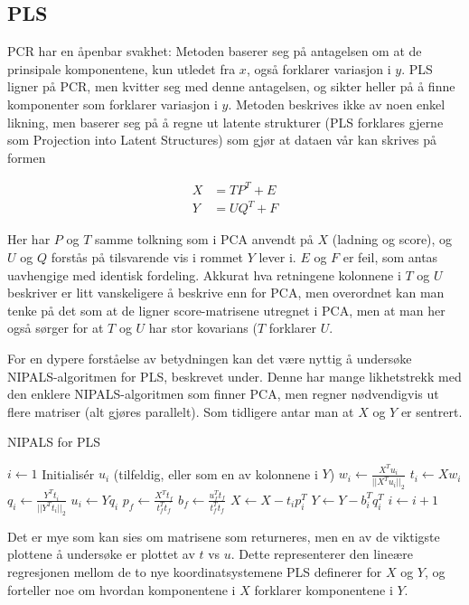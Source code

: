 \subsection{PLS}
PCR har en åpenbar svakhet: Metoden baserer seg på antagelsen om at de prinsipale komponentene, kun utledet fra $x$, også forklarer variasjon i $y$. PLS ligner på PCR, men kvitter seg med denne antagelsen, og sikter heller på å finne komponenter som forklarer variasjon i $y$. Metoden beskrives ikke av noen enkel likning, men baserer seg på å regne ut latente strukturer (PLS forklares gjerne som Projection into Latent Structures) som gjør at dataen vår kan skrives på formen

\begin{align}
	X & = T P^T + E \\
	Y & = U Q^T + F
\end{align}

Her har $P$ og $T$ samme tolkning som i PCA anvendt på $X$ (ladning og score), og $U$ og $Q$ forstås på tilsvarende vis i rommet $Y$ lever i. $E$ og $F$ er feil, som antas uavhengige med identisk fordeling. Akkurat hva retningene kolonnene i $T$ og $U$ beskriver er litt vanskeligere å beskrive enn for PCA, men overordnet kan man tenke på det som at de ligner score-matrisene utregnet i PCA, men at man her også sørger for at $T$ og $U$ har stor kovarians ($T$ forklarer $U$.

	For en dypere forståelse av betydningen kan det være nyttig å undersøke NIPALS-algoritmen for PLS, beskrevet under. Denne har mange likhetstrekk med den enklere NIPALS-algoritmen som finner PCA, men regner nødvendigvis ut flere matriser (alt gjøres parallelt). Som tidligere antar man at $X$ og $Y$ er sentrert.

\begin{algorithm}
	\caption{NIPALS for PLS}\label{alg:nipals_pls} \begin{algorithmic}[1] 
	\State $i \gets 1$
	\State Initialisér $u_i$ (tilfeldig, eller som en av kolonnene i $Y$)
	\State $w_i \gets \frac{X^T u_i}{|| X^T u_i ||_2}$ 
	\State $t_i \gets X w_i$ 
	\State $q_i \gets \frac{Y^T t_i}{|| Y^T t_i ||_2}$ 
	\State $u_i \gets Y q_i$ 
	\EndWhile
	\State $p_f \gets \frac{X^T t_f}{t_f^T t_f}$
	\State $b_f \gets \frac{u_f^T t_f}{t_f^T t_f}$
	\State $X \gets X - t_i p_i^T$ 
	\State $Y \gets Y - b_i^T q_i^T$ 
	\State $i \gets i + 1$
	\EndWhile
\EndProcedure
\end{algorithmic}
\end{algorithm}
Det er mye som kan sies om matrisene som returneres, men en av de viktigste plottene å undersøke er plottet av $t$ vs $u$. Dette representerer den lineære regresjonen mellom de to nye koordinatsystemene PLS definerer for $X$ og $Y$, og forteller noe om hvordan komponentene i $X$ forklarer komponentene i $Y$.


